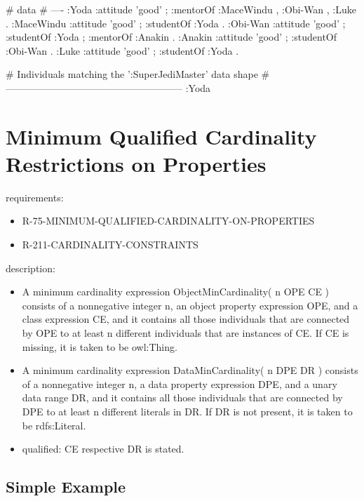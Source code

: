 \documentclass{llncs}
\newcommand{\tb}[1]{\todo[size=\small, color=blue!40]{\textbf{Thomas:} #1}}
\begin{document}
\begin{ex}
# data
# ----
:Yoda 
    :attitude 'good' ;
    :mentorOf :MaceWindu , :Obi-Wan , :Luke .
:MaceWindu
    :attitude 'good' ;
    :studentOf :Yoda .
:Obi-Wan 
    :attitude 'good' ;
    :studentOf :Yoda ;
    :mentorOf :Anakin .
:Anakin
    :attitude 'good' ; 
    :studentOf :Obi-Wan .
:Luke
    :attitude 'good' ;
    :studentOf :Yoda .
\end{ex}

\begin{ex}
# Individuals matching the ’:SuperJediMaster’ data shape
# ------------------------------------------------------
:Yoda 
\end{ex}

\tb{ToDO: add DL}

\section{Minimum Qualified Cardinality Restrictions on Properties}

requirements:

\begin{itemize}
	\item R-75-MINIMUM-QUALIFIED-CARDINALITY-ON-PROPERTIES
  \item R-211-CARDINALITY-CONSTRAINTS
\end{itemize}

description:

\begin{itemize}
	\item A minimum cardinality expression ObjectMinCardinality( n OPE CE ) consists of a nonnegative integer n, an object property expression OPE, and a class expression CE, and it contains all those individuals that are connected by OPE to at least n different individuals that are instances of CE. If CE is missing, it is taken to be owl:Thing.
	\item A minimum cardinality expression DataMinCardinality( n DPE DR ) consists of a nonnegative integer n, a data property expression DPE, and a unary data range DR, and it contains all those individuals that are connected by DPE to at least n different literals in DR. If DR is not present, it is taken to be rdfs:Literal. 
	\item qualified: CE respective DR is stated.
\end{itemize}

\subsection{Simple Example}
\end{document}
